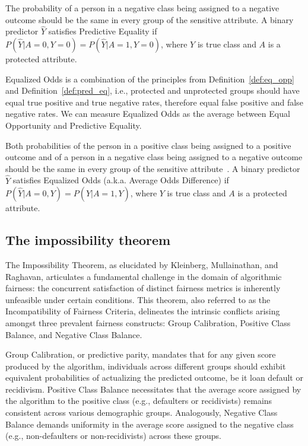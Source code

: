 \begin{definition}\label{def:pred_eq}
The probability of a person in a negative class being assigned to a negative outcome should be the same in every group of the sensitive attribute. A binary predictor $\hat{Y}$ satisfies Predictive Equality if $P(\hat{Y}|A=0,Y=0) = P(\hat{Y}|A=1,Y=0)$, where $Y$ is true class and $A$ is a protected attribute.
\end{definition}

Equalized Odds is a combination of the principles from Definition~\ref{def:eq_opp} and Definition~\ref{def:pred_eq}, i.e., protected and unprotected groups should have equal true positive and true negative rates, therefore equal false positive and false negative rates. We can measure Equalized Odds as the average between Equal Opportunity and Predictive Equality.

\begin{definition}\label{def:eq_odds}
Both probabilities of the person in a positive class being assigned to a positive outcome and of a person in a negative class being assigned to a negative outcome should be the same in every group of the sensitive attribute~\citep{Hardt2016}. A binary predictor $\hat{Y}$ satisfies Equalized Odds (a.k.a. Average Odds Difference) if $P(\hat{Y}|A=0,Y) = P(\hat{Y}|A=1,Y)$, where $Y$ is true class and $A$ is a protected attribute.
\end{definition}

\subsection{The impossibility theorem}

The Impossibility Theorem, as elucidated by Kleinberg, Mullainathan, and Raghavan, articulates a fundamental challenge in the domain of algorithmic fairness: the concurrent satisfaction of distinct fairness metrics is inherently unfeasible under certain conditions. This theorem, also referred to as the Incompatibility of Fairness Criteria, delineates the intrinsic conflicts arising amongst three prevalent fairness constructs: Group Calibration, Positive Class Balance, and Negative Class Balance.

Group Calibration, or predictive parity, mandates that for any given score produced by the algorithm, individuals across different groups should exhibit equivalent probabilities of actualizing the predicted outcome, be it loan default or recidivism. Positive Class Balance necessitates that the average score assigned by the algorithm to the positive class (e.g., defaulters or recidivists) remains consistent across various demographic groups. Analogously, Negative Class Balance demands uniformity in the average score assigned to the negative class (e.g., non-defaulters or non-recidivists) across these groups.

